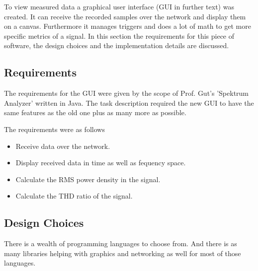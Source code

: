 To view measured data a graphical user interface (GUI in further text) was created. It can receive the recorded samples over the network and display them on a canvas. Furthermore it manages triggers and does a lot of math to get more specific metrics of a signal.
In this section the requirements for this piece of software, the design choices and the implementation details are discussed.

\subsection{Requirements}

The requirements for the GUI were given by the scope of Prof. Gut's 'Spektrum Analyzer' written in Java.
The task description required the new GUI to have the same features as the old one plus as many more as possible.

The requirements were as follows

\begin{itemize}
    \item Receive data over the network.
    \item Display received data in time as well as fequency space.
    \item Calculate the RMS power density in the signal.
    \item Calculate the THD ratio of the signal.
\end{itemize}

\subsection{Design Choices}

There is a wealth of programming languages to choose from. And there is as many libraries helping with graphics and networking as well for most of those languages.

